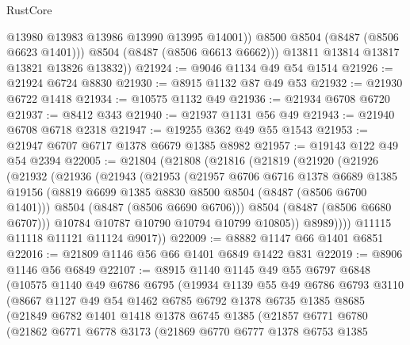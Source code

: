 \begin{lexlean}{RustCore}
\begin{coremodule}
                @13980
                @13983
                @13986
                @13990
                @13995
                @14001))
            @8500
            @8504
            (@8487 (@8506 @6623 @1401)))
          @8504
          (@8487 (@8506 @6613 @6662)))
        @13811
        @13814
        @13817
        @13821
        @13826
        @13832))
@21924 := @9046 @1134 @49 @54 @1514
@21926 := @21924 @6724 @8830
@21930 := @8915 @1132 @87 @49 @53
@21932 := @21930 @6722 @1418
@21934 := @10575 @1132 @49
@21936 := @21934 @6708 @6720
@21937 := @8412 @343
@21940 := @21937 @1131 @56 @49
@21943 := @21940 @6708 @6718 @2318
@21947 := @19255 @362 @49 @55 @1543
@21953 := @21947 @6707 @6717 @1378 @6679 @1385 @8982
@21957 := @19143 @122 @49 @54 @2394
@22005 := @21804
    (@21808
      (@21816
        (@21819
          (@21920
            (@21926
              (@21932
                (@21936
                  (@21943
                    (@21953
                      (@21957
                        @6706
                        @6716
                        @1378
                        @6689
                        @1385
                        @19156
                        (@8819 @6699 @1385 @8830 @8500 @8504 (@8487 (@8506 @6700 @1401)))
                        @8504
                        (@8487 (@8506 @6690 @6706)))
                      @8504
                      (@8487 (@8506 @6680 @6707)))
                    @10784
                    @10787
                    @10790
                    @10794
                    @10799
                    @10805))
                @8989))))
        @11115
        @11118
        @11121
        @11124
        @9017))
@22009 := @8882 @1147 @66 @1401 @6851
@22016 := @21809 @1146 @56 @66 @1401 @6849 @1422 @831
@22019 := @8906 @1146 @56 @6849
@22107 := @8915
    @1140
    @1145
    @49
    @55
    @6797
    @6848
    (@10575
      @1140
      @49
      @6786
      @6795
      (@19934
        @1139
        @55
        @49
        @6786
        @6793
        @3110
        (@8667
          @1127
          @49
          @54
          @1462
          @6785
          @6792
          @1378
          @6735
          @1385
          @8685
          (@21849
            @6782
            @1401
            @1418
            @1378
            @6745
            @1385
            (@21857
              @6771
              @6780
              (@21862
                @6771
                @6778
                @3173
                (@21869
                  @6770
                  @6777
                  @1378
                  @6753
                  @1385

\end{coremodule}
\end{lexlean}

